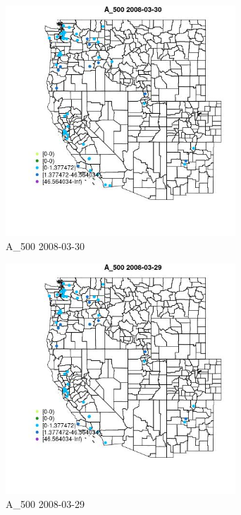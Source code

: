 \begin{figure} 
\centering  
\includegraphics[width=0.77\textwidth]{Code_Outputs/Report_ML_input_PM25_Step4_part_e_de_duplicated_aves_MapObsA_5002008-03-30.jpg} 
\caption{\label{fig:Report_ML_input_PM25_Step4_part_e_de_duplicated_avesMapObsA_5002008-03-30}A_500 2008-03-30} 
\end{figure} 
 

\begin{figure} 
\centering  
\includegraphics[width=0.77\textwidth]{Code_Outputs/Report_ML_input_PM25_Step4_part_e_de_duplicated_aves_MapObsA_5002008-03-29.jpg} 
\caption{\label{fig:Report_ML_input_PM25_Step4_part_e_de_duplicated_avesMapObsA_5002008-03-29}A_500 2008-03-29} 
\end{figure} 
 

